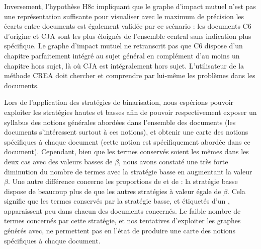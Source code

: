 Inversement, l'hypothèse H8c impliquant que le graphe d'impact mutuel n'est pas une représentation suffisante pour visualiser avec le maximum de précision les écarts entre documents est également validée par ce scénario : les documents C6 d'origine et CJA sont les plus éloignés de l'ensemble central sans indication plus spécifique.
Le graphe d'impact mutuel ne retranscrit pas que C6 dispose d'un chapitre parfaitement intégré au sujet général en complément d'au moins un chapitre hors sujet, là où CJA est intégralement hors sujet.
L'utilisateur de la méthode CREA doit chercher et comprendre par lui-même les problèmes dans les documents.

\bigskip

Lors de l'application des stratégies de binarisation, nous espérions pouvoir exploiter les stratégies hautes et basses afin de pouvoir respectivement exposer un syllabus des notions générales abordées dans l'ensemble des documents (les documents s'intéressent surtout à ces notions), et obtenir une carte des notions spécifiques à chaque document (cette notion est spécifiquement abordée dans ce document).
Cependant, bien que les termes conservés soient les mêmes dans les deux cas avec des valeurs basses de $ \beta $, nous avons constaté une très forte diminution du nombre de termes avec la stratégie basse en augmentant la valeur $ \beta $.
Une autre différence concerne les proportions de  \fg et de  \fg : la stratégie basse dispose de beaucoup plus de  \fg que les autres stratégies à valeur égale de $ \beta $.
Cela signifie que les termes conservés par la stratégie basse, et étiquetés d'un  \fg, apparaissent peu dans chacun des documents concernés.
Le faible nombre de termes concernés par cette stratégie, et nos tentatives d'exploiter les graphes générés avec, ne permettent pas en l'état de produire une carte des notions spécifiques à chaque document.

\bigskip

